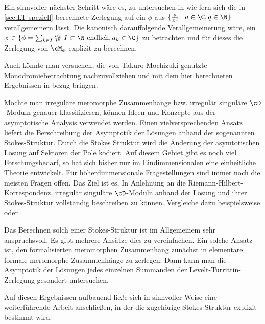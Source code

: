 \begin{comment}
Dies bestätigt die ohnehin bekannte Aussage, dass in unserem Beispiel keine
konvergente Zerlegung zu finden ist.
\end{comment}

Ein sinnvoller nächster Schritt wäre es, zu untersuchen in wie fern sich die in
\ref{sec:LT-speziell} berechnete Zerlegung auf ein $\phi$ aus
$\{\frac{a}{x^q}\mid a\in\C, q\in\N\}$ verallgemeinern lässt.
Die kanonisch darauffolgende Verallgemeinerung wäre, ein $\phi$
$\in\{\phi=\sum_{k\in I}\frac{a_k}{t^{k}}|I\subset\N\mbox{ endlich} ,a_k\in
\C\}$ zu betrachten und für dieses die Zerlegung von $\cM_\phi$ explizit zu
berechnen.

Auch könnte man versuchen, die von Takuro Mochizuki genutzte
Monodromiebetrachtung nachzuvollziehen und mit dem hier berechneten Ergebnissen
in bezug bringen.

Möchte man irreguläre meromorphe Zusammenhänge bzw.  irregulär singuläre
$\cD$-Moduln genauer klassifizieren, können Ideen und Konzepte aus der
asymptotische Analysis verwendet werden.
Einen vielversprechenden Ansatz liefert die Berschreibung der Asymptotik der
Lösungen anhand der sogenannten \glqq{}Stokes-Struktur\grqq{}.
Durch die Stokes Struktur wird die Änderung der asymtotischen Lösung auf
Sektoren der Pole kodiert.
Auf diesem Gebiet gibt es noch viel Forschungsbedarf, so hat sich bisher nur im
Eindimmensionalen eine einheitliche Theorie entwickelt. Für höherdimmensionale
Fragestellungen sind immer noch die meisten Fragen offen.
Das Ziel ist es,
In Anlehnung an die Riemann-Hilbert-Korrespondenz, irregulär singuläre
$\cD$-Moduln anhand der Lösung und ihrer Stokes-Struktur vollständig
beschreiben zu können.
Vergleiche dazu beispielsweise \cite{sabbah2013introduction} oder
\cite{citeulike:8523004}.

Das Berechnen solch einer Stokes-Struktur ist im Allgemeinem sehr
anspruchsvoll.
Es gibt mehrere Ansätze dies zu vereinfachen. Ein solche Ansatz ist, den
formalisierten meromorphen Zusammenhang zunächst in elementare formale
meromorphe Zusammenhänge zu zerlegen.
Dann kann man die Asymptotik der Lösungen jedes einzelnen Summanden der
Levelt-Turrittin-Zerlegung gesondert untersuchen.
\begin{comment}
Ein Versuch, dies zu vereinfachen ist, den fraglichen meromorphen Zusammenhang
zunächst, wie hier, in elementare meromorphe Zusammenhänge zu zerlegen und
schließlich die Asymptotik der zugehörigen Lösungen zu betrachten.
\end{comment}
Auf diesen Ergebnissen aufbauend ließe sich in sinnvoller Weise eine
weiterführende Arbeit anschließen, in der die zugehörige Stokes-Struktur
explizit bestimmt wird.

